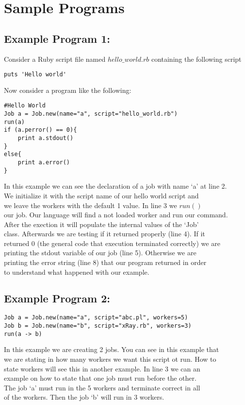 \section{Sample Programs}
\label{sect:samples}
\subsection*{Example Program 1:}
Consider a Ruby script file named $hello\_world.rb$ containing the following script
\begin{verbatim}
puts 'Hello world'
\end{verbatim}
Now consider a \lang{} program like the following:
\begin{verbatim}
#Hello World
Job a = Job.new(name="a", script="hello_world.rb")
run(a)
if (a.perror() == 0){
    print a.stdout()
}
else{
    print a.error()
}
\end{verbatim}

In this example we can see the declaration of a job with name `a' at line 2.\\
We initialize it with the script name of our hello world script and\\
we leave the workers with the default 1 value. In line 3 we $run()$\\
our job. Our language will find a not loaded worker and run our command.\\
After the exection it will populate the internal values of the `Job'\\
class. Afterwards we are testing if it returned properly (line 4). If it\\
returned 0 (the general code that execution terminated correctly) we are\\
printing the stdout variable of our job (line 5). Otherwise we are\\
printing the error string (line 8) that our program returned in order\\
to understand what happened with our example.\\

\subsection*{Example Program 2:}
\begin{verbatim}
Job a = Job.new(name="a", script="abc.pl", workers=5)
Job b = Job.new(name="b", script="xRay.rb", workers=3)
run(a -> b)
\end{verbatim}

In this example we are creating 2 jobs. You can see in this example that\\
we are stating in how many workers we want this script ot run. How to \\
state workers will see this in another example. In line 3 we can an\\
example on how to state that one job must run before the other.\\
The job `a' must run in the 5 workers and terminate correct in all\\
of the workers. Then the job `b' will run in 3 workers.
\\

